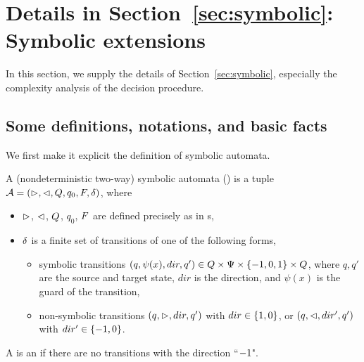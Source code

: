 \section{Details in Section~\ref{sec:symbolic}: Symbolic extensions}\label{app-sym}

In this section, we supply the details of Section~\ref{sec:symbolic}, especially the complexity analysis of the decision procedure.

\subsection{Some definitions, notations, and basic facts}

We first make it explicit the definition of symbolic automata. 

\begin{definition}\label{def-2sa}
    A (nondeterministic two-way)  symbolic automata (\SSA) is a tuple $\mathcal{A} = (\vartriangleright, \vartriangleleft, Q, q_0, F, \delta)$, where  
\begin{itemize}
%
\item $\vartriangleright$, $\vartriangleleft$, $Q$, $q_0$, $F$ are defined precisely as in \FFA{}s, 
%
\item $\delta$ is a finite set of transitions of one of the following forms,
\begin{itemize}
\item     symbolic transitions $(q, \psi(x), dir, q') \in Q \times \Psi \times \{-1, 0, 1\} \times Q$, where $q, q'$ are the source and target state, $dir$ is the direction, and $\psi(x)$ is the guard of the transition, 
%
\item     non-symbolic transitions $(q, \vartriangleright, dir, q')$ with $dir \in \{1, 0\}$, or $(q, \vartriangleleft, dir', q')$ with $dir' \in \{-1,0\}$. 
\end{itemize}
\end{itemize}
A \SSA{} is an \SA{} if there are no transitions with the direction ``$-1$". 
\end{definition}


